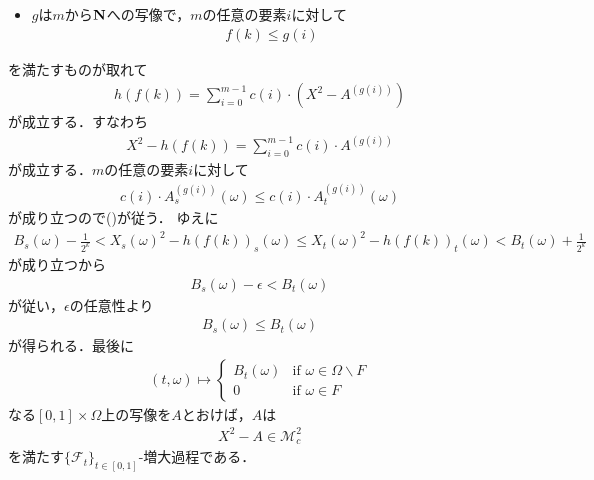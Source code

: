 \begin{sketch}
\begin{description}
\begin{itemize}
					\item $g$は$m$から$\mathbf{N}$への写像で，$m$の任意の要素$i$に対して
						\begin{align}
							f(k) \leq g(i)
						\end{align}
				\end{itemize}
				を満たすものが取れて
				\begin{align}
					h(f(k)) = \sum_{i=0}^{m-1} c(i) \cdot \left( X^{2} - A^{(g(i))} \right)
				\end{align}
				が成立する．すなわち
				\begin{align}
					X^{2} - h(f(k)) = \sum_{i=0}^{m-1} c(i) \cdot A^{(g(i))}
				\end{align}
				が成立する．$m$の任意の要素$i$に対して
				\begin{align}
					c(i) \cdot A^{(g(i))}_{s}(\omega) 
					\leq c(i) \cdot A^{(g(i))}_{t}(\omega) 
				\end{align}
				が成り立つので()が従う．
				ゆえに
				\begin{align}
					B_{s}(\omega) - \frac{1}{2^{k}}
					< {X_{s}(\omega)}^{2} - h(f(k))_{s}(\omega)
					\leq {X_{t}(\omega)}^{2} - h(f(k))_{t}(\omega)
					< B_{t}(\omega) + \frac{1}{2^{k}}
				\end{align}
				が成り立つから
				\begin{align}
					B_{s}(\omega) - \epsilon < B_{t}(\omega)
				\end{align}
				が従い，$\epsilon$の任意性より
				\begin{align}
					B_{s}(\omega) \leq B_{t}(\omega)
				\end{align}
				が得られる．最後に
				\begin{align}
					(t,\omega) \longmapsto
					\begin{cases}
						B_{t}(\omega) & \mbox{if } \omega \in \Omega \backslash F \\
						0 & \mbox{if } \omega \in F
					\end{cases}
				\end{align}
				なる$[0,1] \times \Omega$上の写像を$A$とおけば，$A$は
				\begin{align}
					X^{2} - A \in \mathscr{M}_{c}^{2}
				\end{align}
				を満たす$\{\mathscr{F}_{t}\}_{t \in [0,1]}$-増大過程である．
				

\end{description}
\end{sketch}
